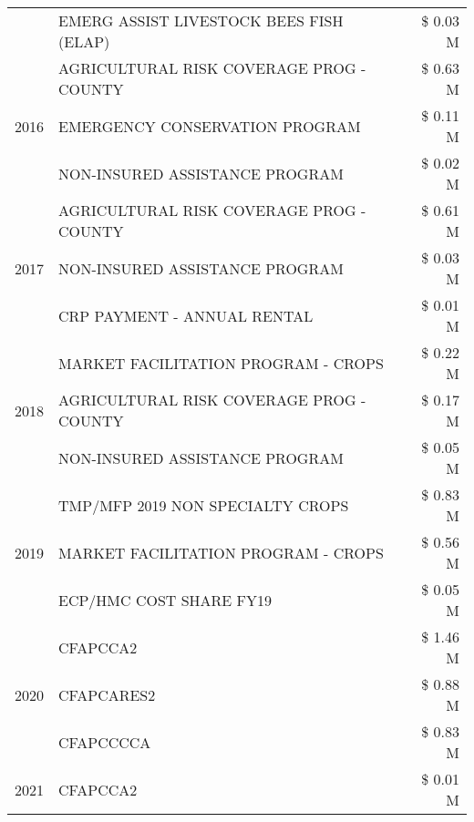 \begin{tabular}{llr}
 & EMERG ASSIST LIVESTOCK BEES FISH (ELAP) & \$ 0.03 M \\
\cline{1-3}
\multirow[t]{3}{*}{2016} & AGRICULTURAL RISK COVERAGE PROG - COUNTY & \$ 0.63 M \\
 & EMERGENCY CONSERVATION PROGRAM & \$ 0.11 M \\
 & NON-INSURED ASSISTANCE PROGRAM & \$ 0.02 M \\
\cline{1-3}
\multirow[t]{3}{*}{2017} & AGRICULTURAL RISK COVERAGE PROG - COUNTY & \$ 0.61 M \\
 & NON-INSURED ASSISTANCE PROGRAM & \$ 0.03 M \\
 & CRP PAYMENT - ANNUAL RENTAL & \$ 0.01 M \\
\cline{1-3}
\multirow[t]{3}{*}{2018} & MARKET FACILITATION PROGRAM - CROPS & \$ 0.22 M \\
 & AGRICULTURAL RISK COVERAGE PROG - COUNTY & \$ 0.17 M \\
 & NON-INSURED ASSISTANCE PROGRAM & \$ 0.05 M \\
\cline{1-3}
\multirow[t]{3}{*}{2019} & TMP/MFP 2019 NON SPECIALTY CROPS & \$ 0.83 M \\
 & MARKET FACILITATION PROGRAM - CROPS & \$ 0.56 M \\
 & ECP/HMC COST SHARE FY19 & \$ 0.05 M \\
\cline{1-3}
\multirow[t]{3}{*}{2020} & CFAPCCA2 & \$ 1.46 M \\
 & CFAPCARES2 & \$ 0.88 M \\
 & CFAPCCCCA & \$ 0.83 M \\
\cline{1-3}
2021 & CFAPCCA2 & \$ 0.01 M \\
\cline{1-3}
\bottomrule
\end{tabular}

